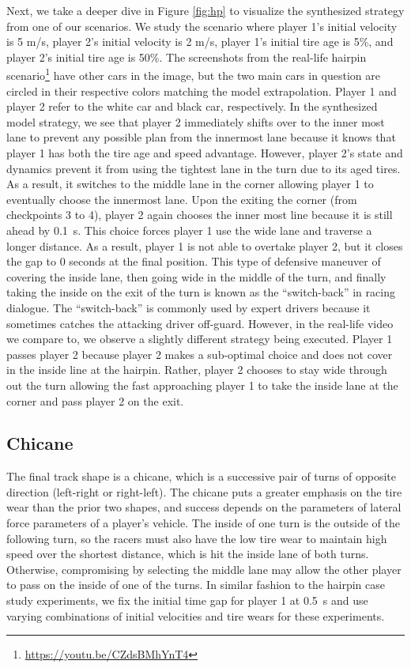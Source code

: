 Next, we take a deeper dive in Figure \ref{fig:hp} to visualize the synthesized strategy from one of our scenarios. We study the scenario where player 1's initial velocity is 5 m/s, player 2's initial velocity is 2 m/s, player 1's initial tire age is 5\%, and player 2's initial tire age is 50\%. The screenshots from the real-life hairpin scenario\footnote{\label{hairpinnote}\url{https://youtu.be/CZdsBMhYnT4}} have other cars in the image, but the two main cars in question are circled in their respective colors matching the model extrapolation. Player 1 and player 2 refer to the white car and black car, respectively. In the synthesized model strategy, we see that player 2 immediately shifts over to the inner most lane to prevent any possible plan from the innermost lane because it knows that player 1 has both the tire age and speed advantage. However, player 2's state and dynamics prevent it from using the tightest lane in the turn due to its aged tires. As a result, it switches to the middle lane in the corner allowing player 1 to eventually choose the innermost lane. Upon the exiting the corner (from checkpoints 3 to 4), player 2 again chooses the inner most line because it is still ahead by \SI{0.1}{\second}. This choice forces player 1 use the wide lane and traverse a longer distance. As a result, player 1 is not able to overtake player 2, but it closes the gap to 0 seconds at the final position. This type of defensive maneuver of covering the inside lane, then going wide in the middle of the turn, and finally taking the inside on the exit of the turn is known as the ``switch-back'' in racing dialogue. The ``switch-back'' is commonly used by expert drivers because it sometimes catches the attacking driver off-guard. However, in the real-life video we compare to, we observe a slightly different strategy being executed. Player 1 passes player 2 because player 2 makes a sub-optimal choice and does not cover in the inside line at the hairpin. Rather, player 2 chooses to stay wide through out the turn allowing the fast approaching player 1 to take the inside lane at the corner and pass player 2 on the exit. 

\FloatBarrier
\subsection{Chicane}
 The final track shape is a chicane, which is a successive pair of turns of opposite direction (left-right or right-left). The chicane puts a greater emphasis on the tire wear than the prior two shapes, and success depends on the parameters of lateral force parameters of a player's vehicle. The inside of one turn is the outside of the following turn, so the racers must also have the low tire wear to maintain high speed over the shortest distance, which is hit the inside lane of both turns. Otherwise, compromising by selecting the middle lane may allow the other player to pass on the inside of one of the turns. In similar fashion to the hairpin case study experiments, we fix the initial time gap for player 1 at \SI{0.5}{\second} and use varying combinations of initial velocities and tire wears for these experiments.
 
